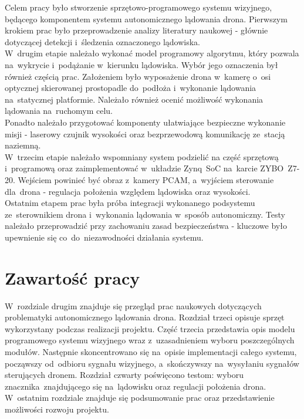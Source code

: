 Celem pracy było stworzenie sprzętowo-programowego systemu wizyjnego, będącego komponentem systemu autonomicznego lądowania drona. Pierwszym krokiem prac było przeprowadzenie analizy literatury naukowej - głównie dotyczącej detekcji i~śledzenia oznaczonego lądowiska. \\
W~drugim etapie należało wykonać model programowy algorytmu, który pozwala na~wykrycie i~podążanie w~kierunku lądowiska. Wybór jego oznaczenia był również częścią prac. Założeniem było wyposażenie drona w~kamerę o~osi optycznej skierowanej prostopadle do~podłoża i~wykonanie lądowania na~statycznej platformie. Należało również ocenić możliwość wykonania lądowania na~ruchomym celu.\\
Ponadto należało przygotować komponenty ułatwiające bezpieczne wykonanie misji - laserowy czujnik wysokości oraz bezprzewodową komunikację ze~stacją naziemną. \\
W~trzecim etapie należało wspomniany system podzielić na część sprzętową i~programową oraz zaimplementować w~układzie Zynq~SoC na~karcie ZYBO~Z7-20. Wejściem powinieć być obraz z~kamery PCAM, a~wyjściem sterowanie dla~drona - regulacja położenia względem lądowiska oraz wysokości.\\
Ostatnim etapem prac była próba integracji wykonanego podsystemu ze~sterownikiem drona i~wykonania lądowania w~sposób autonomiczny. Testy należało przeprowadzić przy zachowaniu zasad bezpieczeństwa - kluczowe było upewnienie się co~do~niezawodności działania systemu.



\section{Zawartość pracy}
\label{sec:zawartoscPracy}
W~rozdziale drugim znajduje się przegląd prac naukowych dotyczących problematyki autonomicznego lądowania drona. Rozdział trzeci opisuje sprzęt wykorzystany podczas realizacji projektu. Część trzecia przedstawia opis modelu programowego systemu wizyjnego wraz z~uzasadnieniem wyboru poszczególnych modułów. Następnie skoncentrowano się na~opisie implementacji całego systemu, począwszy od~odbioru sygnału wizyjnego, a~skończywszy na~wysyłaniu sygnałów sterujących dronem. Rozdział czwarty poświęcono testom: wyboru znacznika~znajdującego się na~lądowisku oraz regulacji położenia drona. W~ostatnim rozdziale znajduje się podsumowanie prac oraz przedstawienie możliwości rozwoju projektu.

